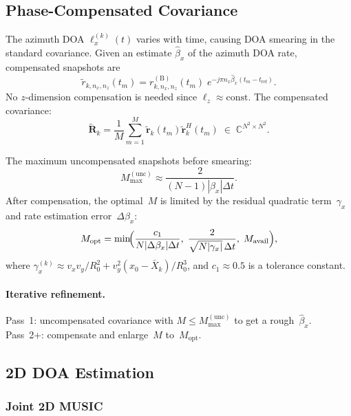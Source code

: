 \documentclass[11pt,a4paper]{article}
\newcommand{\C}{\mathbb{C}}
\begin{document}
\subsection{Phase-Compensated Covariance}
\label{sec:phase_comp}

The azimuth DOA $\ell_x^{(k)}(t)$ varies with time, causing DOA
smearing in the standard covariance.  Given an estimate
$\hat{\beta}_x$ of the azimuth DOA rate, compensated snapshots are
\begin{equation}
  \tilde{r}_{k,n_x,n_z}(t_m) = r_{k,n_x,n_z}^{(\mathrm{B})}(t_m)\;
  e^{-j\pi n_x\hat{\beta}_x(t_m-t_{\mathrm{ref}})}.
  \label{eq:comp}
\end{equation}
No $z$-dimension compensation is needed since
$\ell_z\approx\text{const}$.  The compensated covariance:
\begin{equation}
  \tilde{\mathbf{R}}_k
  =\frac{1}{M}\sum_{m=1}^{M}
  \tilde{\mathbf{r}}_k(t_m)\tilde{\mathbf{r}}_k^H(t_m)
  \;\in\;\C^{N^2\times N^2}.
  \label{eq:cov}
\end{equation}

The maximum uncompensated snapshots before smearing:
\begin{equation}
  M_{\max}^{(\mathrm{unc})}
  \approx\frac{2}{(N{-}1)|\beta_x|\Delta t}.
  \label{eq:Mmax}
\end{equation}
After compensation, the optimal~$M$ is limited by the residual
quadratic term~$\gamma_x$ and rate estimation error~$\Delta\beta_x$:
\begin{equation}
  M_{\mathrm{opt}}=\min\!\Bigl(
  \frac{c_1}{N|\Delta\beta_x|\Delta t},\;
  \frac{2}{\sqrt{N|\gamma_x|}\,\Delta t},\;
  M_{\mathrm{avail}}\Bigr),
  \label{eq:Mopt}
\end{equation}
where
$\gamma_x^{(k)}\approx v_xv_y/R_0^2+v_y^2(x_0{-}\bar{X}_k)/R_0^3$,
and $c_1\approx 0.5$ is a tolerance constant.

\paragraph{Iterative refinement.}
Pass~1: uncompensated covariance with $M\le M_{\max}^{(\mathrm{unc})}$
to get a rough~$\hat{\beta}_x$.
Pass~2+: compensate and enlarge~$M$ to~$M_{\mathrm{opt}}$.

\subsection{2D DOA Estimation}
\label{sec:doa}

\subsubsection{Joint 2D MUSIC}
\end{document}

